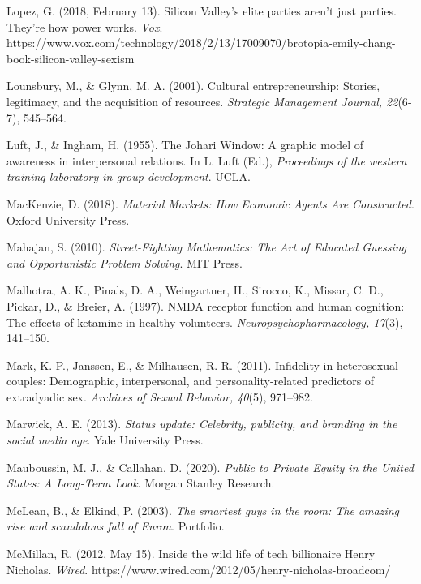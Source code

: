 \begin{thebibliography}{}
    Lopez, G. (2018, February 13). Silicon Valley’s elite parties aren’t just parties. They’re how power works. \textit{Vox}. https://www.vox.com/technology/2018/2/13/17009070/brotopia-emily-chang-book-silicon-valley-sexism

    Lounsbury, M., \& Glynn, M. A. (2001). Cultural entrepreneurship: Stories, legitimacy, and the acquisition of resources. \textit{Strategic Management Journal, 22}(6‐7), 545–564.

    Luft, J., \& Ingham, H. (1955). The Johari Window: A graphic model of awareness in interpersonal relations. In L. Luft (Ed.), \textit{Proceedings of the western training laboratory in group development}. UCLA.


    MacKenzie, D. (2018). \textit{Material Markets: How Economic Agents Are Constructed}. Oxford University Press.

    Mahajan, S. (2010). \textit{Street-Fighting Mathematics: The Art of Educated Guessing and Opportunistic Problem Solving}. MIT Press.

    Malhotra, A. K., Pinals, D. A., Weingartner, H., Sirocco, K., Missar, C. D., Pickar, D., \& Breier, A. (1997). NMDA receptor function and human cognition: The effects of ketamine in healthy volunteers. \textit{Neuropsychopharmacology, 17}(3), 141–150.

    Mark, K. P., Janssen, E., \& Milhausen, R. R. (2011). Infidelity in heterosexual couples: Demographic, interpersonal, and personality-related predictors of extradyadic sex. \textit{Archives of Sexual Behavior, 40}(5), 971–982.

    Marwick, A. E. (2013). \textit{Status update: Celebrity, publicity, and branding in the social media age}. Yale University Press.

    Mauboussin, M. J., \& Callahan, D. (2020). \textit{Public to Private Equity in the United States: A Long-Term Look}. Morgan Stanley Research.

    McLean, B., \& Elkind, P. (2003). \textit{The smartest guys in the room: The amazing rise and scandalous fall of Enron}. Portfolio.

    McMillan, R. (2012, May 15). Inside the wild life of tech billionaire Henry Nicholas. \textit{Wired}. https://www.wired.com/2012/05/henry-nicholas-broadcom/


\end{thebibliography}
